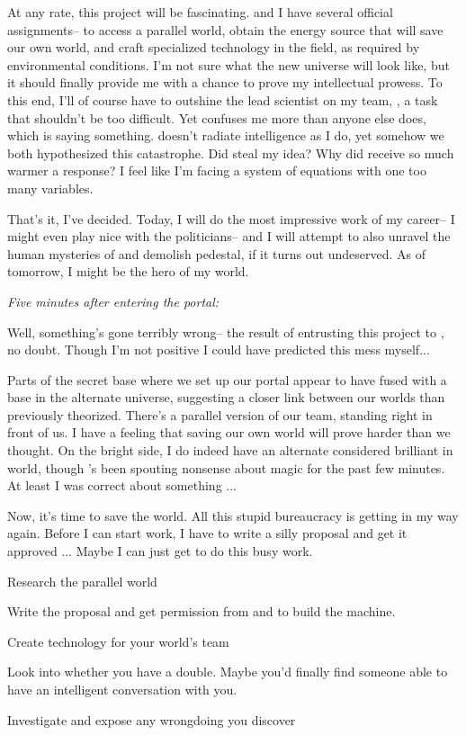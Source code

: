 \documentclass[char]{guildcamp3}
\begin{document}
At any rate, this project will be fascinating. \cSciOne{} and I have several official assignments-- to access a parallel world, obtain the energy source that will save our own world, and craft specialized technology in the field, as required by environmental conditions. I'm not sure what the new universe will look like, but it should finally provide me with a chance to prove my intellectual prowess. To this end, I'll of course have to outshine the lead scientist on my team, \cSciOne{}, a task that shouldn't be too difficult. Yet \cSciOne{\they} confuses me more than anyone else does, which is saying something. \cSciOne{\they} doesn't radiate intelligence as I do, yet somehow we both hypothesized this catastrophe. Did \cSciOne{\they} steal my idea? Why did \cSciOne{\they} receive so much warmer a response? I feel like I'm facing a system of equations with one too many variables.

That's it, I've decided. Today, I will do the most impressive work of my career-- I might even play nice with the politicians-- and I will attempt to also unravel the human mysteries of \cSciOne{} and demolish \cSciOne{\their} pedestal, if it turns out undeserved. As of tomorrow, I might be the hero of my world.

\emph{Five minutes after entering the portal:}


Well, something's gone terribly wrong-- the result of entrusting this project to \cSciOne{}, no doubt. Though I'm not positive I could have predicted this mess myself...

Parts of the secret base where we set up our portal appear to have fused with a base in the alternate universe, suggesting a closer link between our worlds than previously theorized. There's a parallel version of our team, standing right in front of us. I have a feeling that saving our own world will prove harder than we thought.
On the bright side, I do indeed have an alternate considered brilliant in \cMageOne{\their} world, though \cMageOne{\they}'s been spouting nonsense about magic for the past few minutes. At least I was correct about something ...

Now, it's time to save the world. All this stupid bureaucracy is getting in my way again. Before I can start work, I have to write a silly proposal and get it approved ... Maybe I can just get \cSciOne{} to do this busy work.

\begin{itemz}[Goals]
  \item Research the parallel world
  \item Write the proposal and get permission from \cPoliOne{} and \cPoliTwo{} to build the machine. 
  \item Create technology for your world's team
  \item Look into whether you have a double. Maybe you'd finally find someone able to have an intelligent conversation with you. 
  \item Investigate \cSciOne{} and expose any wrongdoing you discover
\end{itemz}
\end{document}

